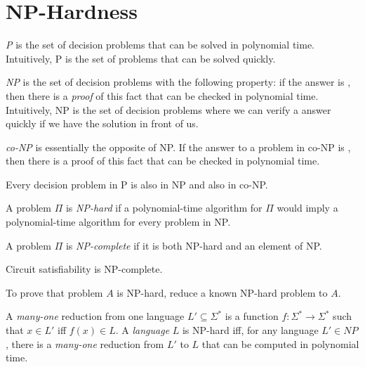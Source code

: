 \section{NP-Hardness}
\begin{definition}
\emph{P} is the set of decision problems that can be solved in polynomial time. Intuitively, P is the set of problems that can be solved quickly.
\end{definition}
\begin{definition}
\emph{NP} is the set of decision problems with the following property: if the answer is , then there is a \emph{proof} of this fact that can be checked in polynomial time. Intuitively, NP is the set of decision problems where we can verify a  answer quickly if we have the solution in front of us.
\end{definition}
\begin{definition}
\emph{co-NP} is essentially the opposite of NP. If the answer to a problem in co-NP is , then there is a proof of this fact that can be checked in polynomial time.
\end{definition}
Every decision problem in P is also in NP and also in co-NP.
\begin{definition}
A problem $\Pi$ is \emph{NP-hard} if a polynomial-time algorithm for $\Pi$ would imply a polynomial-time algorithm for every problem in NP.
\end{definition}
\begin{definition}
A problem $\Pi$ is \emph{NP-complete} if it is both NP-hard and an element of NP.
\end{definition}
\begin{theorem}
Circuit satisfiability is NP-complete.
\end{theorem}
To prove that problem $A$ is NP-hard, reduce a known NP-hard problem to $A$.
\begin{definition}
A \emph{many-one} reduction from one language $L' \subseteq \Sigma^*$ is a function $f : \Sigma^* \rightarrow \Sigma^*$ such that $x \in L'$ iff $f(x) \in L$. A \emph{language} $L$ is NP-hard iff, for any language $L' \in NP$, there is a \emph{many-one} reduction from $L'$ to $L$ that can be computed in polynomial time.
\end{definition}
